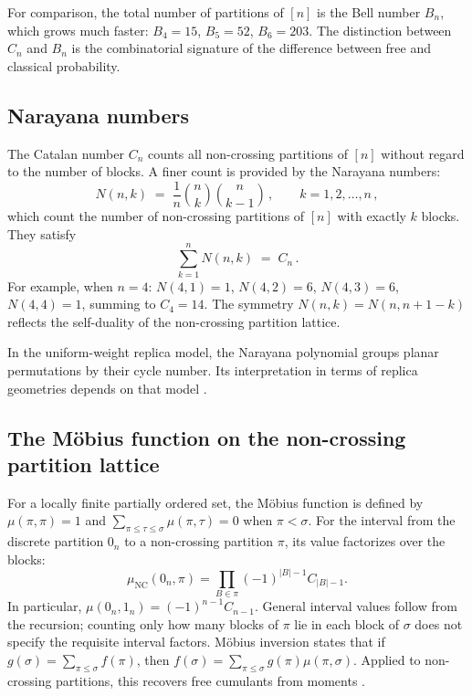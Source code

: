 \documentclass[11pt,letterpaper]{article}
\theoremstyle{plain}
\theoremstyle{definition}
\theoremstyle{remark}
\begin{document}
For comparison, the total number of partitions of $[n]$ is the Bell
number $B_n$, which grows much faster: $B_4 = 15$, $B_5 = 52$,
$B_6 = 203$.  The distinction between $C_n$ and $B_n$ is the
combinatorial signature of the difference between free and classical
probability.

\subsection{Narayana numbers}
\label{subsec11:narayana}

The Catalan number $C_n$ counts all non-crossing partitions of $[n]$
without regard to the number of blocks.  A finer count is provided by
the Narayana numbers:
\begin{equation}
\label{eq11:narayana}
  N(n,k)
  \;=\;
  \frac{1}{n}\binom{n}{k}\binom{n}{k-1}\,,
  \qquad
  k = 1, 2, \ldots, n\,,
\end{equation}
which count the number of non-crossing partitions of $[n]$ with exactly
$k$ blocks.  They satisfy
\begin{equation}
\label{eq11:narayana_sum}
  \sum_{k=1}^{n} N(n,k) \;=\; C_n\,.
\end{equation}
For example, when $n = 4$:
$N(4,1) = 1$, $N(4,2) = 6$, $N(4,3) = 6$, $N(4,4) = 1$, summing to
$C_4 = 14$.  The symmetry $N(n,k) = N(n, n+1-k)$ reflects the
self-duality of the non-crossing partition lattice.

In the uniform-weight replica model, the Narayana polynomial groups
planar permutations by their cycle number. Its interpretation in terms
of replica geometries depends on that model
\cite{pssyetal2022,marolfwangwang2020}.

\subsection{The M\"obius function on the non-crossing partition lattice}
\label{subsec11:mobius}

For a locally finite partially ordered set, the M\"obius function is
defined by $\mu(\pi,\pi)=1$ and
$\sum_{\pi\leq\tau\leq\sigma}\mu(\pi,\tau)=0$ when $\pi<\sigma$.
For the interval from the discrete partition $0_n$ to a non-crossing
partition $\pi$, its value factorizes over the blocks:
\begin{equation}
 \mu_{\mathrm{NC}}(0_n,\pi)
 =\prod_{B\in\pi}(-1)^{|B|-1}C_{|B|-1}.
 \label{eq11:mobius}
\end{equation}
In particular, $\mu(0_n,1_n)=(-1)^{n-1}C_{n-1}$. General interval
values follow from the recursion; counting only how many blocks of
$\pi$ lie in each block of $\sigma$ does not specify the requisite
interval factors. M\"obius inversion states that if
$g(\sigma)=\sum_{\pi\leq\sigma}f(\pi)$, then
$f(\sigma)=\sum_{\pi\leq\sigma}g(\pi)\mu(\pi,\sigma)$.
Applied to non-crossing partitions, this recovers free cumulants
from moments \cite{nicaspeicher2006,speicher1994}.
\end{document}
